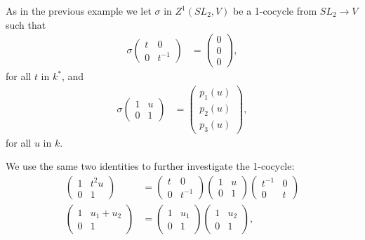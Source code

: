 			As in the previous example we let $\sigma$ in $Z^1(SL_2, V)$ be a 1-cocycle from $SL_2\rightarrow V$ such that
			\begin{align*}
			\sigma\left( \begin{matrix} t & 0 \\ 0 & t^{-1}\end{matrix}\right) &= 
			\left( \begin{matrix} 0 \\ 0 \\0\end{matrix}\right),
			\end{align*}
			for all $t$ in $k^*$, and
			\begin{align*}
			\sigma\left(\begin{matrix} 1& u \\ 0 & 1\end{matrix}\right) &=
			\left(\begin{matrix} p_1(u) \\ p_2(u) \\ p_3(u) \end{matrix}\right),
			\end{align*}
			for all $u$ in $k$.

			We use the same two identities to further investigate the 1-cocycle:
			\begin{align}
			\label{eq:no1}
			\left(\begin{matrix} 1 & t^2u \\ 0 & 1\end{matrix}\right) &=
\left(\begin{matrix} t & 0 \\ 0 & t^{-1}  \end{matrix}\right) 
\left(\begin{matrix} 1 & u \\ 0 & 1 \end{matrix}\right) 
	\left(\begin{matrix}  t^{-1} & 0 \\ 0 & t \end{matrix}\right) \\
		\label{eq:no2}
		\left(\begin{matrix} 1 & u_1 + u_2 \\ 0 & 1 \end{matrix}\right) &=
\left(\begin{matrix} 1 & u_1 \\ 0 & 1 \end{matrix}\right) 
	\left(\begin{matrix} 1 & u_2 \\ 0 & 1 \end{matrix}\right),
	\end{align}

